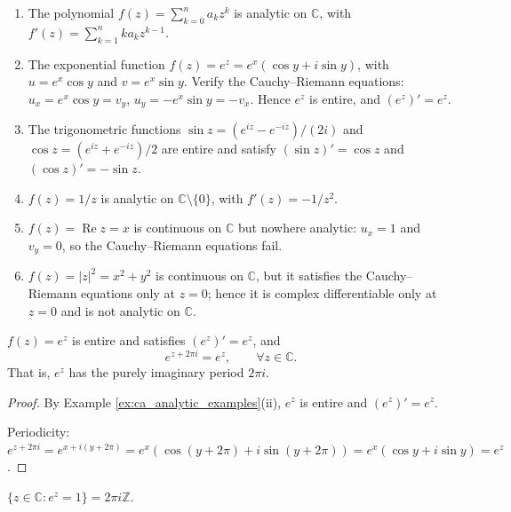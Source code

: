 \begin{example}\label{ex:ca_analytic_examples}
\begin{enumerate}[label=(\roman*)]
    \item The polynomial $f(z) = \sum_{k=0}^{n} a_k z^k$ is analytic on $\mathbb{C}$, with $f'(z) = \sum_{k=1}^{n} k a_k z^{k-1}$.
    \item The exponential function $f(z) = e^z = e^x(\cos y + i \sin y)$, with $u = e^x \cos y$ and $v = e^x \sin y$. Verify the Cauchy--Riemann equations: $u_x = e^x \cos y = v_y$, $u_y = -e^x \sin y = -v_x$. Hence $e^z$ is entire, and $(e^z)' = e^z$.
    \item The trigonometric functions $\sin z = (e^{iz} - e^{-iz})/(2i)$ and $\cos z = (e^{iz} + e^{-iz})/2$ are entire and satisfy $(\sin z)' = \cos z$ and $(\cos z)' = -\sin z$.
    \item $f(z) = 1/z$ is analytic on $\mathbb{C} \setminus \{0\}$, with $f'(z) = -1/z^2$.
    \item $f(z) = \operatorname{Re} z = x$ is continuous on $\mathbb{C}$ but nowhere analytic: $u_x = 1$ and $v_y = 0$, so the Cauchy--Riemann equations fail.
    \item $f(z) = |z|^2 = x^2 + y^2$ is continuous on $\mathbb{C}$, but it satisfies the Cauchy--Riemann equations only at $z = 0$; hence it is complex differentiable only at $z=0$ and is not analytic on $\mathbb{C}$.
\end{enumerate}
\end{example}

\begin{theorem}\label{thm:ca_exp_periodicity}
$f(z) = e^z$ is entire and satisfies $(e^z)' = e^z$, and
\[
e^{z + 2\pi i} = e^z, \qquad \forall z \in \mathbb{C}.
\]
That is, $e^z$ has the purely imaginary period $2\pi i$.
\end{theorem}

\begin{proof}
By Example \ref{ex:ca_analytic_examples}(ii), $e^z$ is entire and $(e^z)' = e^z$.

Periodicity: $e^{z + 2\pi i} = e^{x + i(y + 2\pi)} = e^x(\cos(y + 2\pi) + i \sin(y + 2\pi)) = e^x(\cos y + i \sin y) = e^z$.
\end{proof}

\begin{corollary}\label{cor:ca_exp_kernel}
$\{z \in \mathbb{C} : e^z = 1\} = 2\pi i \mathbb{Z}$.
\end{corollary}

